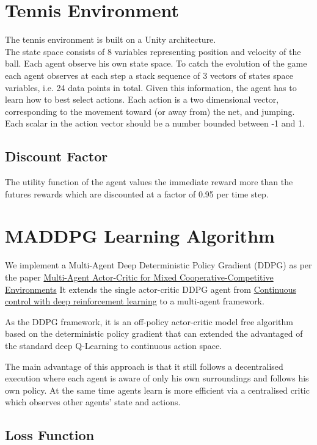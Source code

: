 \documentclass[pagenumber=off]{article}
\begin{document}
\section{Tennis Environment}
The tennis environment is built on a Unity architecture.\\
The state space consists of 8 variables representing position and velocity of the ball. Each agent observe his own state space.
To catch the evolution of the game each agent observes at each step a stack sequence of 3 vectors of states space variables, i.e. 24 data points in total.
Given this information, the agent has to learn how to best select actions. Each action is a two dimensional vector, corresponding to the movement toward (or away from) the net, and jumping. Each scalar in the action vector should be a number bounded between -1 and 1.

\subsection{Discount Factor}
The utility function of the agent values the immediate reward more than the futures rewards which are discounted at a factor of 0.95 per time step.


\section{MADDPG Learning Algorithm}
We implement a Multi-Agent Deep Deterministic Policy Gradient (DDPG) as per the paper \href{https://arxiv.org/pdf/1706.02275}{Multi-Agent Actor-Critic for Mixed Cooperative-Competitive Environments}
It extends the single actor-critic DDPG agent from \href{https://arxiv.org/abs/1509.02971}{Continuous control with deep reinforcement learning} to a multi-agent framework.

As the DDPG framework, it is an off-policy actor-critic model free algorithm based on the deterministic policy gradient that can extended the advantaged of the standard deep Q-Learning to continuous action space.

The main advantage of this approach is that it still follows a decentralised execution where each agent is aware of only his own surroundings and follows his own policy. At the same time agents learn is more efficient via a centralised critic which observes other agents' state and actions.


\subsection{Loss Function}
\end{document}
